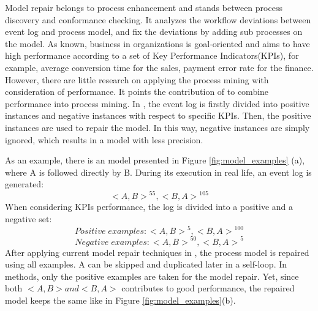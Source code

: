 \documentclass[]{article}
\begin{document}
Model repair belongs to process enhancement and stands between process discovery and conformance checking. It analyzes the workflow deviations between event log  and process model, and fix the deviations by adding sub processes on the model. As known, business in organizations is goal-oriented and aims to have high performance according to a set of Key Performance Indicators(KPIs), for example, average conversion time for the sales, payment error rate for the finance. However, there are little research on applying the process mining with consideration of performance\cite{ghasemi2016process}.  It points the contribution of \cite{dees2017enhancing} to combine performance into process mining. In \cite{dees2017enhancing}, the event log is firstly divided into positive instances and negative instances with respect to specific KPIs. Then, the positive instances are used to repair the model. In this way, negative instances are simply ignored, which results in a model with less precision. %


As an example, there is an model presented in Figure \ref{fig:model_examples} (a), where A is followed directly by B. During its execution in real life, an event log is generated: 
\[{ <A, B> }^{55}  , {<B, A>}^{105} \] 
When considering KPIs performance, the  log is divided into a positive and a negative set: 
\[ Positive \;  examples: { <A, B> }^{5}  , {<B, A>}^{100} \] 
\[ Negative \; examples: { <A, B> }^{50}  , {<B, A>}^{5} \]  
After applying current model repair techniques in \cite{fahland2015model}, the process model is repaired using all examples. A can be skipped and duplicated later in a self-loop. In \cite{dees2017enhancing} methods, only the positive examples are taken for the model repair. Yet, since both $<A,B> and <B,A>$ contributes to good performance,  the repaired model keeps the same like in Figure \ref{fig:model_examples}(b).
\end{document}
